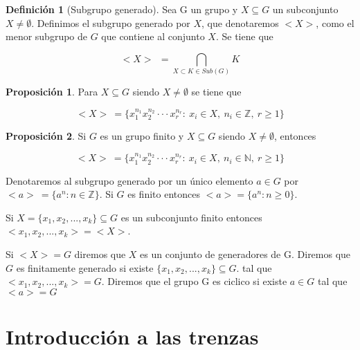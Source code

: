 \documentclass[12pt]{article}
\theoremstyle{definition}
\newtheorem{defi}{Definición}[section]
\newtheorem{prop}{Proposición}[section]
\begin{document}
\begin{defi}[Subgrupo generado]
Sea G un grupo y $X\subseteq G$ un subconjunto $X\neq\emptyset$. Definimos el subgrupo generado por $X$, que denotaremos $<X>$, como el menor subgrupo de $G$ que contiene al conjunto $X$. Se tiene que

$$<X>\ \ =\bigcap_{X\subset K\in Sub(G)}K$$

\end{defi}

\begin{prop}
Para $X\subseteq G$ siendo $X\neq\emptyset$ se tiene que

$$<X>\  = \{x_1^{n_1}x_2^{n_2}\cdot\cdot\cdot x_r^{n_r} :\ x_i\in X,\ n_i\in\mathbb{Z},\ r\geq 1\}$$

\end{prop}

\begin{prop}
Si $G$ es un grupo finito y $X\subseteq G$ siendo $X\neq\emptyset$, entonces

$$<X>\  = \{x_1^{n_1}x_2^{n_2}\cdot\cdot\cdot x_r^{n_r} :\ x_i\in X,\ n_i\in\mathbb{N},\ r\geq 1\}$$

\end{prop}

Denotaremos al subgrupo generado por un único elemento $a\in G$ por $<a>\ = \{a^n:n\in\mathbb{Z}\}$. Si $G$ es finito entonces $<a> = \{a^n:n\geq 0\}$.

Si $X=\{x_1,x_2,...,x_k\}\subseteq G$ es un subconjunto finito entonces $<x_1,x_2,...,x_k>=<X>$.

Si $<X> = G$ diremos que $X$ es un conjunto de generadores de G. Diremos que $G$ es finitamente generado si existe $\{x_1,x_2,...,x_k\}\subseteq G.$ tal que $<x_1,x_2,...,x_k>=G$. Diremos que el grupo G es ciclico si existe $a\in G$ tal que $<a>=G$




\section{Introducción a las trenzas}
\end{document}

